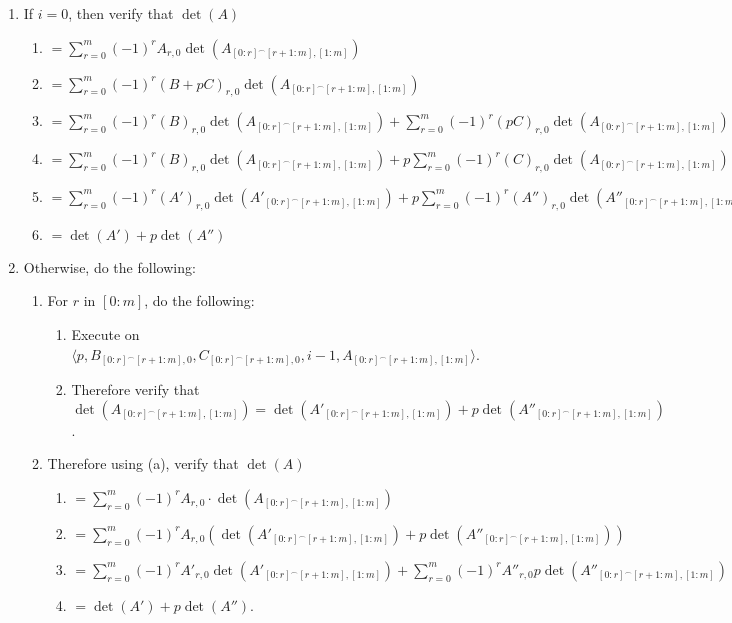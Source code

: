 \documentclass[twocolumn]{article}
\newcommand{\procedurehr}[2][]{\hyperref[sec:procedure #2]{\ifthenelse{\equal{#1}{}}{procedure #2}{#1}}}
\begin{document}
				\begin{enumerate}
					\item If $i=0$, then verify that $\det(A)$
					\begin{enumerate}
						\item $=\sum_{r=0}^m (-1)^{r}A_{r,0}\det(A_{[0:r]^\frown[r+1:m],[1:m]})$
						\item $=\sum_{r=0}^m (-1)^{r}(B+pC)_{r,0}\det(A_{[0:r]^\frown[r+1:m],[1:m]})$
						\item $=\sum_{r=0}^m (-1)^{r}(B)_{r,0}\det(A_{[0:r]^\frown[r+1:m],[1:m]})+\sum_{r=0}^m (-1)^{r}(pC)_{r,0}\det(A_{[0:r]^\frown[r+1:m],[1:m]})$
						\item $=\sum_{r=0}^m (-1)^{r}(B)_{r,0}\det(A_{[0:r]^\frown[r+1:m],[1:m]})+p\sum_{r=0}^m (-1)^{r}(C)_{r,0}\det(A_{[0:r]^\frown[r+1:m],[1:m]})$
						\item $=\sum_{r=0}^m (-1)^{r}(A')_{r,0}\det(A'_{[0:r]^\frown[r+1:m],[1:m]})+p\sum_{r=0}^m (-1)^{r}(A'')_{r,0}\det(A''_{[0:r]^\frown[r+1:m],[1:m]})$
						\item $=\det(A')+p\det(A'')$
					\end{enumerate}
					\item Otherwise, do the following:
					\begin{enumerate}
						\item For $r$ in $[0:m]$, do the following:
						\begin{enumerate}
							\item Execute \procedurehr{3.14} on $\langle p,B_{[0:r]^\frown[r+1:m],0},C_{[0:r]^\frown[r+1:m],0},i-1,A_{[0:r]^\frown[r+1:m],[1:m]}\rangle$.
							\item Therefore verify that $\det(A_{[0:r]^\frown[r+1:m],[1:m]})=\det(A'_{[0:r]^\frown[r+1:m],[1:m]})+p\det(A''_{[0:r]^\frown[r+1:m],[1:m]})$.
						\end{enumerate}
						\item Therefore using (a), verify that $\det(A)$
						\begin{enumerate}
							\item $=\sum_{r=0}^m (-1)^{r}A_{r,0}\cdot\det(A_{[0:r]^\frown[r+1:m],[1:m]})$
							\item $=\sum_{r=0}^m (-1)^{r}A_{r,0}(\det(A'_{[0:r]^\frown[r+1:m],[1:m]})+p\det(A''_{[0:r]^\frown[r+1:m],[1:m]}))$
							\item $=\sum_{r=0}^m (-1)^{r}A'_{r,0}\det(A'_{[0:r]^\frown[r+1:m],[1:m]})+\sum_{r=0}^m (-1)^{r}A''_{r,0}p\det(A''_{[0:r]^\frown[r+1:m],[1:m]})$
							\item $=\det(A')+p\det(A'')$.
						\end{enumerate}
					\end{enumerate}
				\end{enumerate}
\end{document}
